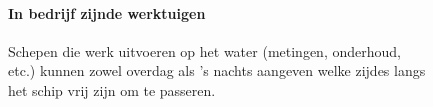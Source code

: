 \begin{figure}[H]
	\centering
	\begin{minipage}[t]{0.50\textwidth}
		\paragraph{In bedrijf zijnde werktuigen}
		Schepen die werk uitvoeren op het water (metingen, onderhoud, etc.) kunnen  zowel overdag als 's nachts aangeven welke zijdes langs het schip vrij zijn om te passeren. 
	\end{minipage}
	\hfill
		\begin{minipage}[t]{0.22\textwidth}
		\RemoveLine
		\caption{}
		\label{pic:optisch:in_bedrijf}
	\end{minipage}
	\hfill
	\begin{minipage}[t]{0.22\textwidth}
		\RemoveLine
		\caption{}
		\label{pic:optisch:in_bedrijf2}
	\end{minipage}
\end{figure}
